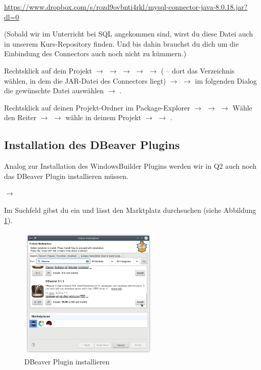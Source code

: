 \url{https://www.dropbox.com/s/rozd9ovbnti4rkl/mysql-connector-java-8.0.18.jar?dl=0}

(Sobald wir im Unterricht bei SQL angekommen sind, wirst du diese Datei auch in
unserem Kurs-Repository finden. Und bis dahin brauchst du dich um die
Einbindung des Connectors auch noch nicht zu kümmern.)

Rechtsklick auf dein Projekt $\rightarrow$  $\rightarrow$
 $\rightarrow$  $\rightarrow$ 
$\rightarrow$  ( -- dort das Verzeichnis
wählen, in dem die JAR-Datei des Connectors liegt) $\rightarrow$ 
$\rightarrow$ im folgenden Dialog die gewünschte Datei auswählen $\rightarrow$
.

Rechtsklick auf deinen Projekt-Ordner im Package-Explorer $\rightarrow$
 $\rightarrow$ 
$\rightarrow$ Wähle den Reiter  $\rightarrow$  $\rightarrow$ wähle  in
deinem Projekt $\rightarrow$  $\rightarrow$ .

\subsection{Installation des DBeaver Plugins}

Analog zur Installation des WindowsBuilder Plugins werden wir in Q2 auch noch 
das DBeaver Plugin installieren müssen.

 $\rightarrow$ 

Im Suchfeld gibst du  ein und lässt den Marktplatz
durchsuchen (siehe Abbildung \ref{fig:dbeaver-plugin}).

\begin{figure}[h]
  \centering
   \includegraphics[width=0.6\textwidth]{./inf/SEKII/01_Vorbereitung/dbeaver_plugin.png}
   \caption{DBeaver Plugin installieren}
   \label{fig:dbeaver-plugin}
\end{figure}


